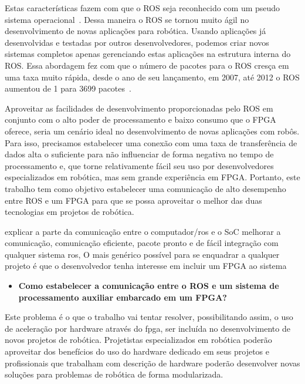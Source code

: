 Estas características fazem com que o ROS seja reconhecido com um pseudo sistema operacional~\cite{rosPYO}. Dessa maneira o ROS se tornou muito ágil no desenvolvimento de novas aplicações para robótica. Usando aplicações já desenvolvidas e testadas por outros desenvolvedores, podemos criar novos sistemas completos apenas gerenciando estas aplicações na estrutura interna do ROS. Essa abordagem fez com que o número de pacotes para o ROS cresça em uma taxa muito rápida, desde o ano de seu lançamento, em 2007, até 2012 o ROS aumentou de 1 para 3699 pacotes~\cite{fpgarobotics}.

Aproveitar as facilidades de desenvolvimento proporcionadas pelo ROS em conjunto com o alto poder de processamento e baixo consumo que o FPGA oferece, seria um cenário ideal no desenvolvimento de novas aplicações com robôs. Para isso, precisamos estabelecer uma conexão com uma taxa de transferência de dados alta o suficiente para não influenciar de forma negativa no tempo de processamento e, que torne relativamente fácil seu uso por desenvolvedores especializados em robótica, mas sem grande experiência em FPGA. Portanto, este trabalho tem como objetivo estabelecer uma comunicação de alto desempenho entre ROS e um FPGA para que se possa aproveitar o melhor das duas tecnologias em projetos de robótica. 

explicar a parte da comunicação entre o computador/ros e o SoC melhorar a comunicação, comunicação eficiente, pacote pronto e de fácil integração com qualquer sistema ros, O mais genérico possível para se enquadrar a qualquer projeto é que o desenvolvedor tenha interesse em incluir um FPGA ao sistema



\begin{itemize}
    \item \textbf{Como estabelecer a comunicação entre o ROS e um sistema de processamento auxiliar 
embarcado em um FPGA?}

\end{itemize}

Este problema é o que o trabalho vai tentar resolver, possibilitando assim, o uso de aceleração por hardware através do fpga, ser incluída no desenvolvimento de novos projetos de robótica. Projetistas especializados em robótica poderão aproveitar dos benefícios do uso do hardware dedicado em seus projetos e profissionais que trabalham com descrição de hardware poderão desenvolver novas soluções para problemas de robótica de forma modularizada. 





